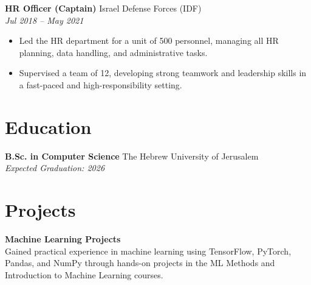 \documentclass[a4paper,10pt]{article}
\begin{document}
\textbf{HR Officer (Captain)} \hfill Israel Defense Forces (IDF) \\
\textit{Jul 2018 -- May 2021}
\begin{itemize}[noitemsep,nolistsep]
    \item Led the HR department for a unit of 500 personnel, managing all HR planning, data handling, and administrative tasks.
    \item Supervised a team of 12, developing strong teamwork and leadership skills in a fast-paced and high-responsibility setting.
\end{itemize}

\section*{Education}
\textbf{B.Sc. in Computer Science} \hfill The Hebrew University of Jerusalem \\
\textit{Expected Graduation: 2026} \\

\section*{Projects}
\textbf{Machine Learning Projects} \\
Gained practical experience in machine learning using TensorFlow, PyTorch, Pandas, and NumPy through hands-on projects in the ML Methods and Introduction to Machine Learning courses.
\end{document}
